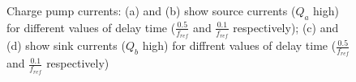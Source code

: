 \documentclass[lettersize,journal]{IEEEtran}
\begin{document}
\begin{figure}[!ht]
    \centering
    \hfil
    \hfil
    \hfil
    \hfil
    \caption{Charge pump currents: (a) and (b) show source currents (\(Q_a\) high) for different values of delay time (\(\frac{0.5}{f_{ref}}\) and \(\frac{0.1}{f_{ref}}\) respectively); (c) and (d) show sink currents (\(Q_b\) high) for diffrent values of delay time (\(\frac{0.5}{f_{ref}}\) and \(\frac{0.1}{f_{ref}}\) respectively)} 
    \label{fig:cp_test_waveforms}
\end{figure}
\end{document}
